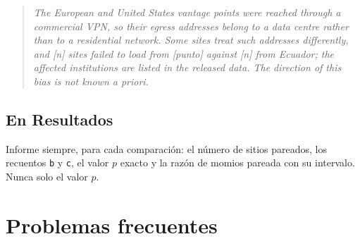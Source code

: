 \documentclass[11pt,a4paper]{article}
\begin{document}
\begin{quote}
	\small
	\textit{The European and United States vantage points were reached through a commercial VPN, so their egress addresses belong to a data centre rather than to a residential network. Some sites treat such addresses differently, and [n] sites failed to load from [punto] against [n] from Ecuador; the affected institutions are listed in the released data. The direction of this bias is not known a priori.}
\end{quote}

\subsection{En Resultados}

Informe siempre, para cada comparación: el número de sitios pareados, los recuentos \texttt{b} y \texttt{c}, el valor $p$ exacto y la razón de momios pareada con su intervalo. Nunca solo el valor $p$.

\section{Problemas frecuentes}\label{sec:problemas}
\end{document}
